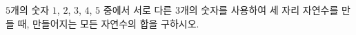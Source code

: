 \hspace*{2mm}\begin{minipage}[t]{\dimexpr\linewidth-2mm\relax}\vspace{0pt}
$5$개의 숫자 $1$, $2$, $3$, $4$, $5$ 중에서 서로 다른 $3$개의 숫자를 사용하여 세 자리 자연수를 만들 때, 만들어지는 모든 자연수의 합을 구하시오.\end{minipage}
